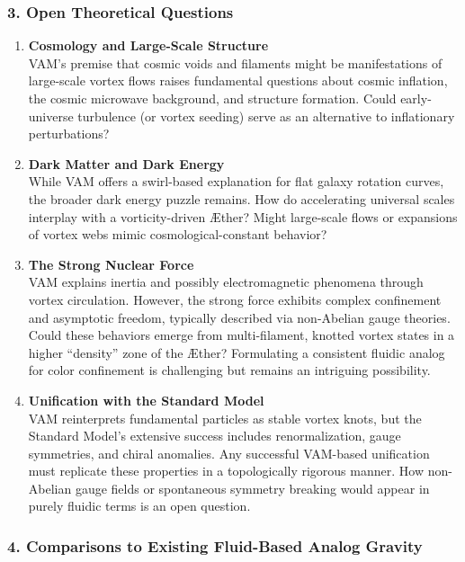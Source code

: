 \documentclass[aps,preprint,superscriptaddress]{revtex4-2}
\begin{document}
    \subsubsection*{3. Open Theoretical Questions}

    \begin{enumerate}
        \item \textbf{Cosmology and Large-Scale Structure} \\
    VAM’s premise that cosmic voids and filaments might be manifestations of large-scale vortex flows raises fundamental questions about cosmic inflation, the cosmic microwave background, and structure formation. Could early-universe turbulence (or vortex seeding) serve as an alternative to inflationary perturbations?

        \item \textbf{Dark Matter and Dark Energy} \\
    While VAM offers a swirl-based explanation for flat galaxy rotation curves, the broader dark energy puzzle remains. How do accelerating universal scales interplay with a vorticity-driven Æther? Might large-scale flows or expansions of vortex webs mimic cosmological-constant behavior?

        \item \textbf{The Strong Nuclear Force} \\
    VAM explains inertia and possibly electromagnetic phenomena through vortex circulation. However, the strong force exhibits complex confinement and asymptotic freedom, typically described via non-Abelian gauge theories. Could these behaviors emerge from multi-filament, knotted vortex states in a higher “density” zone of the Æther? Formulating a consistent fluidic analog for color confinement is challenging but remains an intriguing possibility.

        \item \textbf{Unification with the Standard Model} \\
    VAM reinterprets fundamental particles as stable vortex knots, but the Standard Model’s extensive success includes renormalization, gauge symmetries, and chiral anomalies. Any successful VAM-based unification must replicate these properties in a topologically rigorous manner. How non-Abelian gauge fields or spontaneous symmetry breaking would appear in purely fluidic terms is an open question.
    \end{enumerate}

    \subsubsection*{4. Comparisons to Existing Fluid-Based Analog Gravity}
\end{document}
